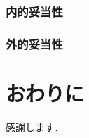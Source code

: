 \documentclass[11pt]{jreport}
\begin{document}
\subsection{内的妥当性}

\subsection{外的妥当性}

\chapter{おわりに}



\begin{acknowledgements}
感謝します．
\end{acknowledgements}
\end{document}
